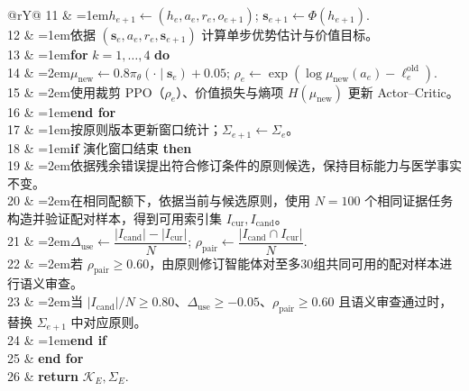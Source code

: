 \begin{algorithm}[H]
\begin{tabularx}{\linewidth}{@{}rY@{}}
11 & \hangindent=1em\quad $h_{e+1}\leftarrow(h_e,a_e,r_e,o_{e+1})$; $\mathbf{s}_{e+1}\leftarrow\Phi(h_{e+1})$.\\
12 & \hangindent=1em\quad 依据 $(\mathbf{s}_e,a_e,r_e,\mathbf{s}_{e+1})$ 计算单步优势估计与价值目标。\\
13 & \hangindent=1em\quad \textbf{for} $k=1,\ldots,4$ \textbf{do}\\
14 & \hangindent=2em\qquad $\mu_{\mathrm{new}}\leftarrow0.8\pi_\theta(\cdot\mid\mathbf{s}_e)+0.05$; $\rho_e\leftarrow\exp\!\left(\log\mu_{\mathrm{new}}(a_e)-\ell_e^{\mathrm{old}}\right)$.\\
15 & \hangindent=2em\qquad 使用裁剪 PPO（$\rho_e$）、价值损失与熵项 $H(\mu_{\mathrm{new}})$ 更新 Actor--Critic。\\
16 & \hangindent=1em\quad \textbf{end for}\\
17 & \hangindent=1em\quad 按原则版本更新窗口统计；$\Sigma_{e+1}\leftarrow\Sigma_e$。\\
18 & \hangindent=1em\quad \textbf{if} 演化窗口结束 \textbf{then}\\
19 & \hangindent=2em\qquad 依据残余错误提出符合修订条件的原则候选，保持目标能力与医学事实不变。\\
20 & \hangindent=2em\qquad 在相同配额下，依据当前与候选原则，使用 $N=100$ 个相同证据任务构造并验证配对样本，得到可用索引集 $I_{\mathrm{cur}},I_{\mathrm{cand}}$。\\
21 & \hangindent=2em\qquad $\Delta_{\mathrm{use}}\leftarrow\dfrac{|I_{\mathrm{cand}}|-|I_{\mathrm{cur}}|}{N}$; $\rho_{\mathrm{pair}}\leftarrow\dfrac{|I_{\mathrm{cand}}\cap I_{\mathrm{cur}}|}{N}$.\\
22 & \hangindent=2em\qquad 若 $\rho_{\mathrm{pair}}\geq0.60$，由原则修订智能体对至多30组共同可用的配对样本进行语义审查。\\
23 & \hangindent=2em\qquad 当 $|I_{\mathrm{cand}}|/N\geq0.80$、$\Delta_{\mathrm{use}}\geq-0.05$、$\rho_{\mathrm{pair}}\geq0.60$ 且语义审查通过时，替换 $\Sigma_{e+1}$ 中对应原则。\\
24 & \hangindent=1em\quad \textbf{end if}\\
25 & \textbf{end for}\\
26 & \textbf{return} $\mathcal K_E,\Sigma_E$.\\
\bottomrule
\end{tabularx}
\caption{CoEvoMed：学习响应驱动的监督构造。}
\label{alg:coevomed}
\end{algorithm}

